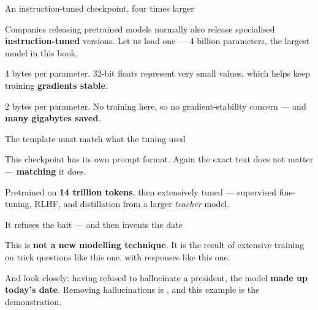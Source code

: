 \documentclass[aspectratio=169,11pt,t]{beamer}
\begin{document}
\begin{frame}[shrink=25]{An instruction-tuned checkpoint, four times larger}
{\fontsize{9.4}{12.6}\selectfont\color{fg2}Companies releasing pretrained models normally also release specialised \textbf{instruction-tuned} versions. Let us load one --- 4 billion parameters, the largest model in this book.\par}\vskip 4pt
\begin{minipage}[t]{0.494\textwidth}
\begin{icard}
4 bytes per parameter. 32-bit floats represent very small values, which helps keep training \textbf{gradients stable}.
\end{icard}
\end{minipage}%
\hfill
\begin{minipage}[t]{0.494\textwidth}
\begin{icardaccent}
2 bytes per parameter. No training here, so no gradient-stability concern --- and \textbf{many gigabytes saved}.
\end{icardaccent}
\end{minipage}%
\end{frame}

\begin{frame}[shrink=25]{The template must match what the tuning used}
{\fontsize{9.4}{12.6}\selectfont\color{fg2}This checkpoint has its own prompt format. Again the exact text does not matter --- \textbf{matching} it does.\par}\vskip 4pt
{\fontsize{9.4}{12.6}\selectfont\color{fg2}Pretrained on \textbf{14 trillion tokens}, then extensively tuned --- supervised fine-tuning, RLHF, and distillation from a larger \textit{teacher} model.\par}\vskip 4pt
\end{frame}

\begin{frame}[shrink=25]{It refuses the bait --- and then invents the date}
{\fontsize{9.4}{12.6}\selectfont\color{fg2}This is \textbf{not a new modelling technique}. It is the result of extensive training on trick questions like this one, with responses like this one.\par}\vskip 4pt
\begin{iband}[rose]
And look closely: having refused to hallucinate a president, the model \textbf{made up today's date}. Removing hallucinations is , and this example is the demonstration.
\end{iband}
\end{frame}
\end{document}
